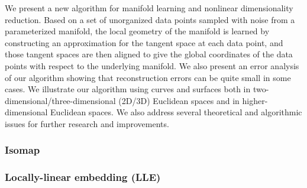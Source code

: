 \documentclass[journal, a4paper]{IEEEtran}
\begin{document}
%

We present a new algorithm for manifold learning and nonlinear dimensionality reduction. Based on a set of unorganized data points sampled with noise from a parameterized manifold, the local geometry of the manifold is learned by constructing an approximation for the tangent space at each data point, and those tangent spaces are then aligned to give the global coordinates of the data points with respect to the underlying manifold. We also present an error analysis of our algorithm showing that reconstruction errors can be quite small in some cases. We illustrate our algorithm using curves and surfaces both in two-dimensional/three-dimensional (2D/3D) Euclidean spaces and in higher-dimensional Euclidean spaces. We also address several theoretical and algorithmic issues for further research and improvements.




\subsubsection{Isomap}

%


\subsubsection{Locally-linear embedding (LLE)}
\end{document}
